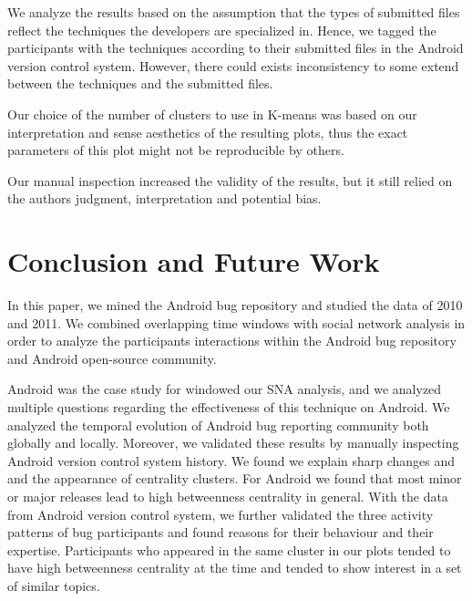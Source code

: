 \documentclass[10pt, conference, compsocconf]{IEEEtran}
\begin{document}

We analyze the results based on the assumption that the types of
submitted files reflect the techniques the developers are specialized
in. Hence, we tagged the participants with the techniques according to
their submitted files in the Android version control system. However,
there could exists inconsistency to some extend between the techniques
and the submitted files.

Our choice of the number of clusters to use in K-means was based on
our interpretation and sense aesthetics of the resulting plots, thus
the exact parameters of this plot might not be reproducible by others.

Our manual inspection increased the validity of the results, but it
still relied on the authors judgment, interpretation and potential bias.

\section{Conclusion and Future Work}
\label{conclusion}

In this paper, we mined the Android bug repository and studied the
data of 2010 and 2011. We combined overlapping time windows with
social network analysis in order to analyze the participants
interactions within the Android bug repository and Android open-source community.

Android was the case study for windowed our SNA analysis, and we
analyzed multiple questions regarding the effectiveness of this
technique on Android.  We analyzed the temporal evolution of Android
bug reporting community both globally and locally.  Moreover, we
validated these results by manually inspecting Android version control
system history. We found we explain sharp changes and and the
appearance of centrality clusters.  For Android we found that most
minor or major releases lead to high betweenness centrality in
general. With the data from Android version control system, we further
validated the three activity patterns of bug participants and found
reasons for their behaviour and their expertise.  Participants who
appeared in the same cluster in our plots tended to 
have high betweenness centrality at the time and tended to show interest
in a set of similar topics.
\end{document}
